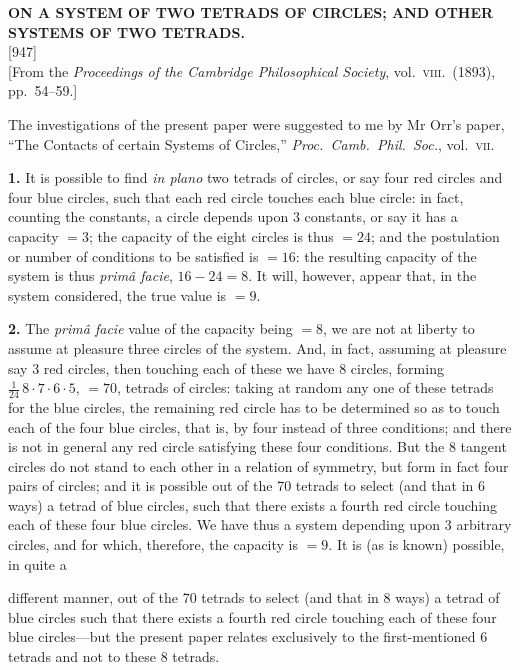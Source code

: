 \documentclass[11pt]{article}
\newcommand{\paper}[3]{%
  \clearpage
  \begin{center}
    {\large\bfseries #2}\\[0.5em]
    {\small [#1]}\\[0.3em]
    {\small #3}
  \end{center}
  \vspace{0.5em}
}
\begin{document}
\setcounter{page}{425}

\paper{947}{ON A SYSTEM OF TWO TETRADS OF CIRCLES; AND OTHER SYSTEMS OF TWO TETRADS.}{[From the \textit{Proceedings of the Cambridge Philosophical Society}, vol.\ \textsc{viii}.\ (1893), pp.\ 54--59.]}

\noindent The investigations of the present paper were suggested to me by Mr Orr's paper, ``The Contacts of certain Systems of Circles,'' \textit{Proc.\ Camb.\ Phil.\ Soc.}, vol.\ \textsc{vii}.

\medskip
\noindent\textbf{1.} It is possible to find \textit{in plano} two tetrads of circles, or say four red circles and four blue circles, such that each red circle touches each blue circle: in fact, counting the constants, a circle depends upon 3 constants, or say it has a capacity $= 3$; the capacity of the eight circles is thus $= 24$; and the postulation or number of conditions to be satisfied is $= 16$: the resulting capacity of the system is thus \textit{prim\^a facie}, $16 - 24 = 8$. It will, however, appear that, in the system considered, the true value is $= 9$.

\medskip
\noindent\textbf{2.} The \textit{prim\^a facie} value of the capacity being $= 8$, we are not at liberty to assume at pleasure three circles of the system. And, in fact, assuming at pleasure say 3 red circles, then touching each of these we have 8 circles, forming $\tfrac{1}{24}\,8 \cdot 7 \cdot 6 \cdot 5$, $= 70$, tetrads of circles: taking at random any one of these tetrads for the blue circles, the remaining red circle has to be determined so as to touch each of the four blue circles, that is, by four instead of three conditions; and there is not in general any red circle satisfying these four conditions. But the 8 tangent circles do not stand to each other in a relation of symmetry, but form in fact four pairs of circles; and it is possible out of the 70 tetrads to select (and that in 6 ways) a tetrad of blue circles, such that there exists a fourth red circle touching each of these four blue circles. We have thus a system depending upon 3 arbitrary circles, and for which, therefore, the capacity is $= 9$. It is (as is known) possible, in quite a

different manner, out of the 70 tetrads to select (and that in 8 ways) a tetrad of blue circles such that there exists a fourth red circle touching each of these four blue circles---but the present paper relates exclusively to the first-mentioned 6 tetrads and not to these 8 tetrads.
\end{document}
